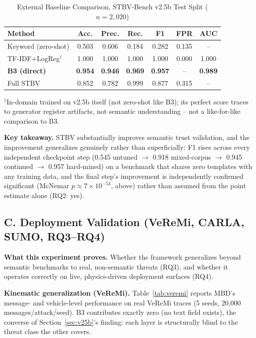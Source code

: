 \documentclass[conference]{IEEEtran}
\begin{document}
\begin{table}[t]
\centering
\caption{External Baseline Comparison, STBV-Bench v2.5b Test Split ($n{=}2{,}020$)}
\label{tab:baseline}
\footnotesize
\begin{tabular}{@{}lcccccc@{}}
\toprule
Method & Acc. & Prec. & Rec. & F1 & FPR & AUC \\
\midrule
Keyword (zero-shot) & 0.503 & 0.606 & 0.184 & 0.282 & 0.135 & -- \\
TF-IDF+LogReg$^\dagger$ & 1.000 & 1.000 & 1.000 & 1.000 & 0.000 & 1.000 \\
\textbf{B3 (direct)} & \textbf{0.954} & \textbf{0.946} & \textbf{0.969} & \textbf{0.957} & -- & \textbf{0.989} \\
Full STBV & 0.852 & 0.782 & 0.999 & 0.877 & 0.315 & -- \\
\bottomrule
\end{tabular}
\par\vspace{2pt}\raggedright\footnotesize
$^\dagger$In-domain trained on v2.5b itself (not zero-shot like B3); its perfect score traces to generator register artifacts, not semantic understanding -- not a like-for-like comparison to B3.
\end{table}

\textbf{Key takeaway.} STBV substantially improves semantic trust validation, and the improvement generalizes genuinely rather than superficially: F1 rises across every independent checkpoint step (0.545 untuned $\to$ 0.918 mixed-corpus $\to$ 0.945 continued $\to$ 0.957 hard-mined) on a benchmark that shares zero templates with any training data, and the final step's improvement is independently confirmed significant (McNemar $p{\approx}7\times10^{-53}$, above) rather than assumed from the point estimate alone (RQ2: yes).

\subsection{C. Deployment Validation (VeReMi, CARLA, SUMO, RQ3--RQ4)}
\textbf{What this experiment proves.} Whether the framework generalizes beyond semantic benchmarks to real, non-semantic threats (RQ3), and whether it operates correctly on live, physics-driven deployment surfaces (RQ4).

\textbf{Kinematic generalization (VeReMi).} Table~\ref{tab:veremi} reports MBD's message- and vehicle-level performance on real VeReMi traces (5 seeds, 20,000 messages/attack/seed). B3 contributes exactly zero (no text field exists), the converse of Section~\ref{sec:v25b}'s finding: each layer is structurally blind to the threat class the other covers.
\end{document}
